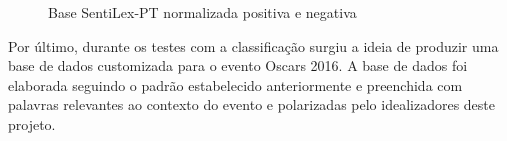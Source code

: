 \begin{figure}[h]
	\caption{Base SentiLex-PT normalizada positiva e negativa}
	
\end{figure}

Por último, durante os testes com a classificação surgiu a ideia de produzir uma base de dados customizada para o evento Oscars 2016. A base de dados foi elaborada seguindo o padrão estabelecido anteriormente e preenchida com palavras relevantes ao contexto do evento e polarizadas pelo idealizadores deste projeto.

